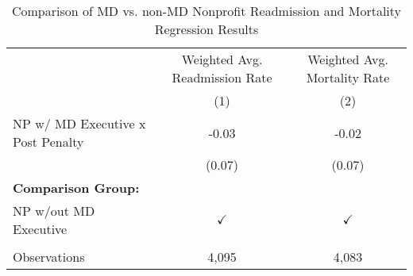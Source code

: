 \begin{table}[htbp]
   \caption{\label{tab:MD_noMD_fullsample} Comparison of MD vs. non-MD Nonprofit Readmission and Mortality Regression Results}
   \bigskip
   \centering
   \begin{tabular}{lcc}
      \toprule
                                        & Weighted Avg. Readmission Rate & Weighted Avg. Mortality Rate\\  
                                        & (1)                            & (2)\\  
      \midrule 
      NP w/ MD Executive x Post Penalty & -0.03                          & -0.02\\   
                                        & (0.07)                         & (0.07)\\   
      \textbf{Comparison Group:}        &                                & \\  
      NP w/out MD Executive             & $\checkmark$                   & $\checkmark$\\   
       \\
      Observations                      & 4,095                          & 4,083\\  
      \bottomrule
   \end{tabular}
\end{table}
